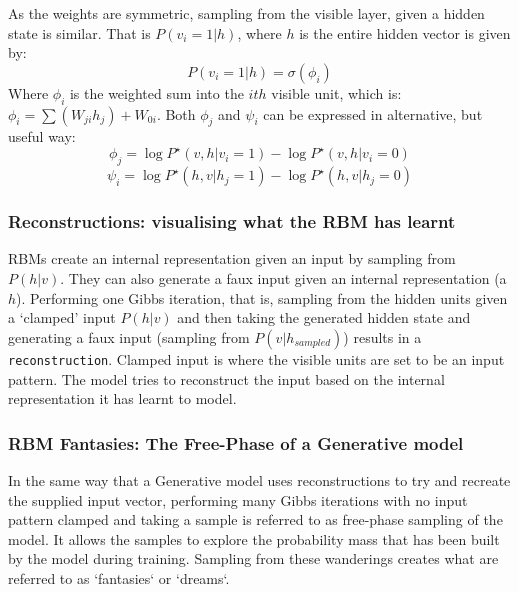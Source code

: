     As the weights are symmetric, sampling from the visible layer, given a hidden state is similar. That is $P(v_i = 1 | h)$, where $h$ is the entire hidden vector is given by:
    \begin{equation}\label{eq:Vis-Gibbs-Update}
     P(v_i = 1 | h) = \sigma(\phi_{i})
    \end{equation}
    Where $\phi_i$ is the weighted sum into the $ith$ visible unit, which is: $ \phi_i = \sum(W_{ji}h_{j}) + W_{0i} $. Both $\phi_j$ and $\psi_i$ can be expressed in alternative, but useful way:
    \begin{equation}
    \phi_j = \log P^\star(v,h | v_i = 1) - \log P^\star(v,h | v_i = 0)
    \end{equation}
    \begin{equation}\label{psi-gibbs-update-rbm}
    \psi_i = \log P^\star(h,v | h_j = 1) - \log P^\star(h,v | h_j = 0)
    \end{equation}



\subsubsection{Reconstructions: visualising what the RBM has learnt}\label{SS:RBM-Reconstructions}

RBMs create an internal representation given an input by sampling from $P(h|v)$. They can also generate a faux input given an internal representation (a $h$). Performing one Gibbs iteration, that is, sampling from the hidden units given a `clamped' input $ P(h|v) $ and then taking the generated hidden state and generating a faux input (sampling from $P(v|h_{sampled})$) results in a \texttt{reconstruction}. Clamped input is where the visible units are set to be an input pattern. The model tries to reconstruct the input based on the internal representation it has learnt to model.

\subsubsection{RBM Fantasies: The Free-Phase of a Generative model}\label{S:Dreams}

In the same way that a Generative model uses reconstructions to try and recreate the supplied input vector, performing many Gibbs iterations with no input pattern clamped and taking a sample is referred to as free-phase sampling of the model. It allows the samples to explore the probability mass that has been built by the model during training. Sampling from these wanderings creates what are referred to as `fantasies` or `dreams`.
